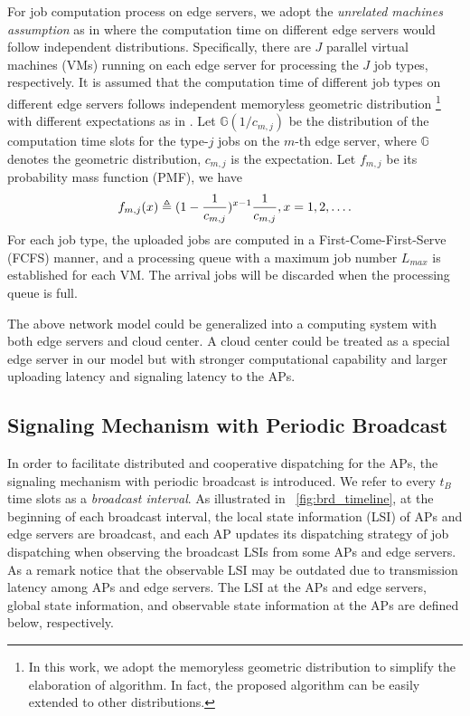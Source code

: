 For job computation process on edge servers, we adopt the \emph{unrelated machines assumption} as in \cite{tan-online} where the computation time on different edge servers would follow independent distributions.
Specifically, there are $J$ parallel virtual machines (VMs) running on each edge server for processing the $J$ job types, respectively.
It is assumed that the computation time of different job types on different edge servers follows independent memoryless geometric distribution 
\footnote{In this work, we adopt the memoryless geometric distribution to simplify the elaboration of algorithm. In fact, the proposed algorithm can be easily extended to other distributions.}
with different expectations as in \cite{TOWC18-HuangKb}.
Let $\mathbb{G}(1/c_{m,j})$ be the distribution of the computation time slots for the type-$j$ jobs on the $m$-th edge server, where $\mathbb{G}$ denotes the geometric distribution, $c_{m,j}$ is the expectation.
Let $f_{m,j}$ be its probability mass function (PMF), we have
\begin{align}
    f_{m,j}(x) \triangleq (1-\frac{1}{c_{m,j}})^{x-1} \frac{1}{c_{m,j}}, x=1,2,\dots.
\end{align}
For each job type, the uploaded jobs are computed in a First-Come-First-Serve (FCFS) manner, and a processing queue with a maximum job number $L_{max}$ is established for each VM.
The arrival jobs will be discarded when the processing queue is full.

\begin{remark}
    The above network model could be generalized into a computing system with both edge servers and cloud center.
    A cloud center could be treated as a special edge server in our model but with stronger computational capability and larger uploading latency and signaling latency to the APs.
\end{remark}

\subsection{Signaling Mechanism with Periodic Broadcast}
\label{subsec:chapter3-broadcast}
In order to facilitate distributed and cooperative dispatching for the APs, {the signaling mechanism with periodic broadcast is introduced.}
We refer to every $t_B$ time slots as a \emph{broadcast interval}.
As illustrated in \figurename~\ref{fig:brd_timeline}, at the beginning of each broadcast interval, the local state information (LSI) of APs and edge servers are broadcast, and each AP updates its dispatching strategy of job dispatching when observing the broadcast LSIs from some APs and edge servers.
As a remark notice that the observable LSI may be outdated due to transmission latency among APs and edge servers.
The LSI at the APs and edge servers, global state information, and observable state information at the APs are defined below, respectively.

